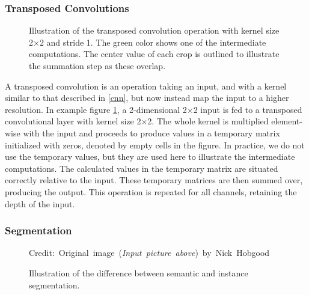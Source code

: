\subsubsection{Transposed Convolutions}
    \begin{figure}[H]
        \centering
        
        
        
        \caption[Transposed convolution]{Illustration of the transposed convolution operation with kernel size 2×2 and stride 1. The green color shows one of the intermediate computations. The center value of each crop is outlined to illustrate the summation step as these overlap.}
      	\medskip 
        \label{transposed_conv_fig}
    \end{figure}
    A transposed convolution is an operation taking an input, and with a kernel similar to that described in \ref{cnn}, but now instead map the input to a higher resolution\cite{dumoulin2016guide_transposed_convolution}. In example figure \ref{transposed_conv_fig}, a 2-dimensional 2×2 input is fed to a transposed convolutional layer with kernel size 2×2. The whole kernel is multiplied element-wise with the input and proceeds to produce values in a temporary matrix initialized with zeros, denoted by empty cells in the figure. In practice, we do not use the temporary values, but they are used here to illustrate the intermediate computations. The calculated values in the temporary matrix are situated correctly relative to the input. These temporary matrices are then summed over, producing the output. This operation is repeated for all channels, retaining the depth of the input. 
            


\subsubsection{Segmentation}
    \begin{figure}[H]
        \centering
        
        \caption[Difference between semantic and instance segmentation]{Illustration of the difference between semantic and instance segmentation.}
      	\medskip 
        \hspace*{15pt}\hbox{\scriptsize Credit: Original image (\textit{Input picture above}) by Nick Hobgood\cite{clownfish_image}}
        \label{segmentation_fig}
    \end{figure}

